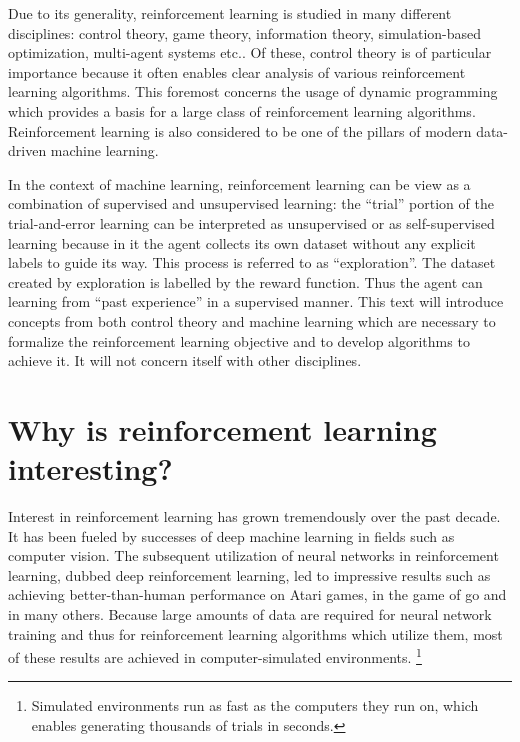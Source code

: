  

Due to its generality, reinforcement learning is studied in many different disciplines: 
control theory, game theory,
information theory, simulation-based optimization, multi-agent systems etc..
Of these, control theory is of particular importance because it
often enables clear analysis of various reinforcement learning algorithms.
This foremost concerns the usage of dynamic programming which
provides a basis for a large class of reinforcement learning algorithms.
Reinforcement learning is also considered to be one of the pillars of modern data-driven machine learning.


In the context of machine learning, reinforcement learning can be view as a combination 
of supervised and unsupervised learning:
the ``trial'' portion of the trial-and-error learning can be interpreted as unsupervised or as self-supervised learning
because in it the agent collects its own dataset without any explicit labels to guide its way.
This process is referred to as ``exploration''.
The dataset created by exploration is labelled by the reward function.
Thus the agent can learning from ``past experience'' in a supervised manner.
This text will introduce concepts from both control theory
and machine learning which are necessary to formalize the reinforcement learning objective
and to develop algorithms to achieve it.
It will not concern itself with other disciplines.

\section{Why is reinforcement learning interesting?}
\label{sec-why-is-rl-interesting}
Interest in reinforcement learning has grown tremendously over the past decade.
It has been fueled by successes of deep machine learning in fields such as computer vision.
The subsequent utilization of neural networks in reinforcement learning,
dubbed deep reinforcement learning,
led to impressive results such as achieving better-than-human
performance on Atari games, in the game of go and in many others.
Because large amounts of data are required for neural network training
and thus for reinforcement learning algorithms which utilize them,
most of these results are achieved in computer-simulated environments.
\footnote{Simulated environments run as fast as the computers they run on,
		which enables generating thousands of trials in seconds.}

